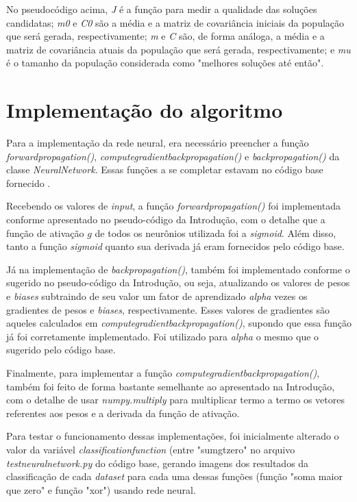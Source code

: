 \documentclass[conference]{IEEEtran}
\begin{document}
No pseudocódigo acima, \textit{J} é a função para medir a qualidade das soluções candidatas; \textit{m0} e \textit{C0} são a média e a matriz de covariância iniciais da população que será gerada, respectivamente; \textit{m} e \textit{C} são, de forma análoga, a média e a matriz de covariância atuais da população que será gerada, respectivamente; e \textit{mu} é o tamanho da população considerada como "melhores soluções até então".

\section{Implementação do algoritmo}
Para a implementação da rede neural, era necessário preencher a função \textit{forward\underline{\space}propagation()}, \textit{compute\underline{\space}gradient\underline{\space}back\underline{\space}propagation()} e \textit{back\underline{\space}propagation()} da classe \textit{NeuralNetwork}. Essas funções a se completar estavam no código base fornecido \cite{roteiro}.  

Recebendo os valores de \textit{input}, a função \textit{forward\underline{\space}propagation()} foi implementada conforme apresentado no pseudo-código da Introdução, com o detalhe que a função de ativação $g$ de todos os neurônios utilizada foi a \textit{sigmoid}. Além disso, tanto a função \textit{sigmoid} quanto sua derivada já eram fornecidos pelo código base. 

Já na implementação de \textit{back\underline{\space}propagation()}, também foi implementado conforme o sugerido no pseudo-código da Introdução, ou seja, atualizando os valores de pesos e \textit{biases} subtraindo de seu valor um fator de aprendizado \textit{alpha} vezes os gradientes de pesos e \textit{biases}, respectivamente. Esses valores de gradientes são aqueles calculados em \textit{compute\underline{\space}gradient\underline{\space}back\underline{\space}propagation()}, supondo que essa função já foi corretamente implementado. Foi utilizado para \textit{alpha} o mesmo que o sugerido pelo código base. 

Finalmente, para implementar a função \textit{compute\underline{\space}gradient\underline{\space}back\underline{\space}propagation()}, também foi feito de forma bastante semelhante ao apresentado na Introdução, com o detalhe de usar \textit{numpy.multiply} para multiplicar termo a termo os vetores referentes aos pesos e a derivada da função de ativação.

Para testar o funcionamento dessas implementações, foi inicialmente alterado o valor da variável \textit{classification\underline{\space}function} (entre "sum\underline{\space}gt\underline{\space}zero" no arquivo \textit{test\underline{\space}neural\underline{\space}network.py} do código base, gerando imagens dos resultados da classificação de cada \textit{dataset} para cada uma dessas funções (função "soma maior que zero" e função "xor") usando rede neural.
\end{document}
